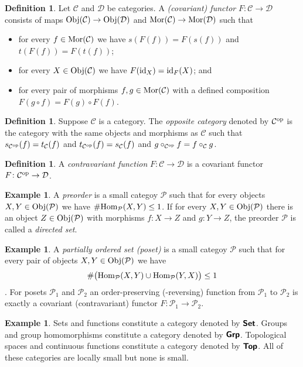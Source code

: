 \documentclass[12pt]{article}
\theoremstyle{definition}
\newtheorem{dfn}[thm]{Definition}
\newtheorem{exm}[thm]{Example}
\theoremstyle{remark}
\newcommand{\catvar}[1]{\mathcal{#1}}
\newcommand{\CC}{\catvar{C}}
\newcommand{\DD}{\catvar{D}}
\newcommand{\PP}{\catvar{P}}
\newcommand{\catname}[1]{\textup{\sffamily\textbf{#1}}}
\newcommand*{\Set}{\catname{Set}}
\newcommand*{\Grp}{\catname{Grp}}
\newcommand*{\Top}{\catname{Top}}
\newcommand{\Obj}[1]{\textup{Obj}(#1)}
\newcommand{\Mor}[1]{\textup{Mor}(#1)}
\begin{document}
    \begin{dfn}
        Let $\CC$ and $\DD$ be categories. A \emph{(covariant) functor} $F\colon\CC\to\DD$ consists of maps $\Obj{\CC}\to\Obj{\DD}$ and $\Mor{\CC}\to\Mor{\DD}$ such that
        \begin{itemize}
            \item for every $f\in\Mor{\CC}$ we have $s(F(f))=F(s(f))$ and $t(F(f))=F(t(f))$;
            \item for every $X\in\Obj{\CC}$ we have $F(\textup{id}_X)=\textup{id}_F(X)$; and
            \item for every pair of morphisms $f,g\in\Mor{\CC}$ with a defined composition $F(g\circ f)=F(g)\circ F(f)$.
        \end{itemize}
    \end{dfn}

    \begin{dfn}
        Suppose $\CC$ is a category. The \emph{opposite category} denoted by $\CC^{\textup{op}}$ is the category with the same objects and morphisms as $\CC$ such that $s_{\CC^{\textup{op}}}(f)=t_{\CC}(f)$ and $t_{\CC^{\textup{op}}}(f)=s_{\CC}(f)$ and $g\circ_{\CC^\textup{op}} f=f\circ_\CC g$.
    \end{dfn}

    \begin{dfn}
        A \emph{contravariant function} $F\colon\CC\to\DD$ is a covariant functor $F\colon\CC^\textup{op}\to\DD$.
    \end{dfn}

    \begin{exm}
        A \emph{preorder} is a small categoy $\PP$ such that for every objects $X,Y\in\Obj{\PP}$ we have $\#\textup{Hom}_\PP(X,Y)\leq1$. If for every $X,Y\in\Obj{\PP}$ there is an object $Z\in\Obj{\PP}$ with morphisms $f\colon X\to Z$ and $g\colon Y\to Z$, the preorder $\PP$ is called a \emph{directed set}.
    \end{exm}

    \begin{exm}
        A \emph{partially ordered set (poset)} is a small categoy $\PP$ such that for every pair of objects $X,Y\in\Obj{\PP}$ we have $$\#\big(\textup{Hom}_\PP(X,Y)\cup\textup{Hom}_\PP(Y,X)\big)\leq1$$. For posets $\PP_1$ and $\PP_2$ an order-preserving (-reversing) function from $\PP_1$ to $\PP_2$ is exactly a covariant (contravariant) functor $F\colon\PP_1\to\PP_2$.
    \end{exm}

    \begin{exm}
        Sets and functions constitute a category denoted by $\Set$. Groups and group homomorphisms constitute a category denoted by $\Grp$. Topological spaces and continuous functions constitute a category denoted by $\Top$. All of these categories are locally small but none is small.
    \end{exm}
\end{document}
